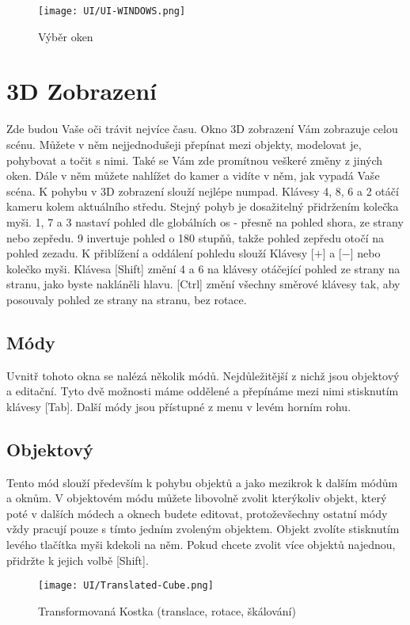 \documentclass[12pt,a4paper]{report}
\begin{document}
	\begin{figure}[h]
		\centering
		\texttt{[image: UI/UI-WINDOWS.png]}
		\caption{Výběr oken}
		\label{pic:windows-selection}
	\end{figure}

	\section{3D Zobrazení}
	
	Zde budou Vaše oči trávit nejvíce času. Okno 3D zobrazení Vám zobrazuje
celou scénu. Můžete v něm nejjednodušeji přepínat mezi objekty,
modelovat je, pohybovat a točit s nimi. Také se Vám zde promítnou
veškeré změny z jiných oken. Dále v něm můžete nahlížet do kamer
a vidíte v něm, jak vypadá Vaše scéna.
K pohybu v 3D zobrazení slouží nejlépe numpad. Klávesy 4, 8, 6 a 2 otáčí
	kameru kolem aktuálního středu. Stejný pohyb je dosažitelný přidržením
kolečka myši. 1, 7 a 3 nastaví pohled dle globálních os - přesně na pohled
shora, ze strany nebo zepředu. 9 invertuje pohled o 180 stupňů, takže pohled
zepředu otočí na pohled zezadu. K přiblížení a oddálení pohledu slouží
Klávesy [$+$] a [$-$] nebo kolečko myši.
Klávesa [Shift] změní 4 a 6 na klávesy otáčející pohled ze strany na
stranu, jako byste nakláněli hlavu. [Ctrl] změní všechny směrové klávesy
tak, aby posouvaly pohled ze strany na stranu, bez rotace.
	
	\subsection{Módy}
	Uvnitř tohoto okna se nalézá několik módů. Nejdůležitější z nichž jsou
	objektový a editační. Tyto dvě možnosti máme oddělené a přepínáme
	mezi nimi stisknutím klávesy [Tab]. Další módy jsou přístupné z menu
	v levém horním rohu.
	
	\subsection{Objektový}
	Tento mód slouží především k pohybu objektů a jako mezikrok k dalším
	módům a oknům. V objektovém módu můžete libovolně zvolit kterýkoliv
	objekt, který poté v dalších módech a oknech budete editovat, protoževšechny ostatní módy vždy pracují pouze s tímto jedním zvoleným
objektem.
	Objekt zvolíte stisknutím levého tlačítka myši kdekoli na něm.
	Pokud chcete zvolit více objektů najednou, přidržte k jejich volbě [Shift].
	
	\begin{figure}[h]
		\centering
		\texttt{[image: UI/Translated-Cube.png]}
		\caption{Transformovaná Kostka (translace, rotace, škálování)}
		\label{pic:cube-positioning}
	\end{figure}
\end{document}
